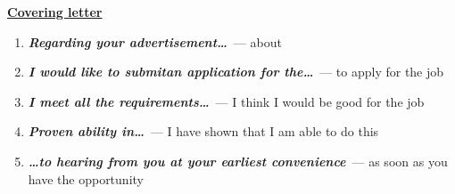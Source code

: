 \documentclass[10pt,a4paper]{article}
\newcommand\ex[1]{\textit{\textbf{{#1}}}}
\begin{document}
\par\medskip\textbf{\underline{Covering letter}}
\begin{enumerate}
  \item \ex{Regarding your advertisement\dots}~--- about
  \item \ex{I would like to submitan application for the\dots}~--- to apply for the job
  \item \ex{I meet all the requirements\dots}~--- I think I would be good for the job
  \item \ex{Proven ability in\dots}~--- I have shown that I am able to do this
  \item \ex{\dots to hearing from you at your earliest convenience}~--- as soon as you have the opportunity
\end{enumerate}
\end{document}
